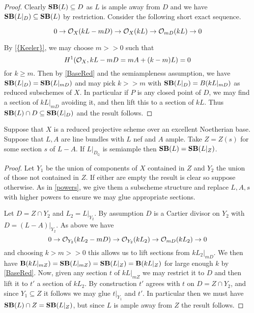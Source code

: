 \begin{proof}
	Clearly $\SB(L) \subseteq D$ as $L$ is ample away from $D$ and we have $\SB(L|_{D}) \subseteq \SB(L)$ by restriction. Consider the following short exact sequence.
	
	\[0 \to \ox (kL-mD) \to \ox(kL) \to \ox[mD](kL) \to 0\]
	
	By \autoref{{Keeler}}, we may choose $m >>0$ such that $$H^{1}(\ox,kL-mD=mA+(k-m)L)=0$$ for $k \geq m$. Then by \autoref{BaseRed} and the semiampleness assumption, we have $\SB(L|_{D})=\SB(L|_{mD})$ and may pick $k>> m$ with $\SB(L|_{D})=B(kL|_{mD})$ as reduced subschemes of $X$. In particular if $P$ is any closed point of $D$, we may find a section of $kL|_{mD}$ avoiding it, and then lift this to a section of $kL$. Thus $\SB(L)\cap D \subseteq \SB(L|_{D}) $ and the result follows.

\end{proof}


\begin{lemma}
	Suppose that $X$ is a reduced projective scheme over an excellent Noetherian base. Suppose that $L,A$ are line bundles with $L$ nef and $A$ ample. Take $Z=Z(s)$ for some section $s$ of $L-A$. If $L|_{D_{\mathbb{Q}}}$ is semiample then $\SB(L)=\SB(L|_{Z})$.
\end{lemma}

\begin{proof}
	Let $Y_{1}$ be the union of components of $X$ contained in $Z$ and $Y_{2}$ the union of those not contained in $Z$. If either are empty the result is clear so suppose otherwise. As in \autoref{powers}, we give them a subscheme structure and replace $L,A,s$ with higher powers to ensure we may glue appropriate sections.
	
	Let $D=Z \cap Y_{2}$ and $L_{2}=L|_{Y_{2}}$. By assumption $D$ is a Cartier divisor on $Y_{2}$ with $D=(L-A)|_{Y_{2}}$. As above we have 
	\[0 \to \ox[Y_{2}] (kL_{2}-mD) \to \ox[Y_{2}](kL_{2}) \to \ox[mD](kL_{2}) \to 0\]
	and choosing $k > m >>0$ this allows us to lift sections from $kL_{2}|_{mD}$. We then have $\BB(kL|_{mZ})=\SB(L|_{mZ})=\SB(L|_{Z})= \BB(kL|_{Z})$ for large enough $k$ by \autoref{BaseRed}. Now, given any section $t$ of $kL|_{mZ}$ we may restrict it to $D$ and then lift it to $t'$ a section of $kL_{2}$. By construction $t'$ agrees with $t$ on $D=Z \cap Y_{2}$, and since $Y_{1} \subseteq Z$ it follows we may glue $t|_{Y_{1}}$ and $t'$. In particular then we must have $\SB(L)\cap Z = \SB(L|_{Z})$, but since $L$ is ample away from $Z$ the result follows.
\end{proof}



